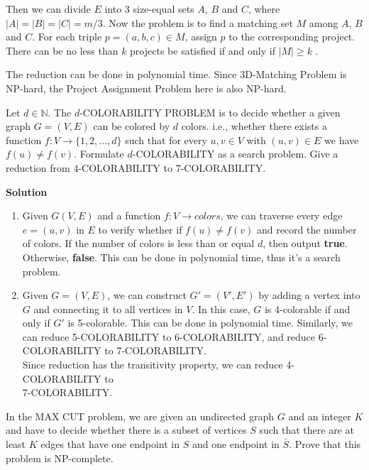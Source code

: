 \documentclass{article}
\newcounter{exercise}
\newcommand{\<}{
    \langle}
\renewcommand{\>}{
    \rangle}
\begin{document}
{Then we can divide $E$ into 3 size-equal sets $A$, $B$ and $C$, where $|A| = |B| = |C| = m/3$. Now the problem is to find a matching set $M$  among $A$, $B$ and $C$. For each triple $p=(a,b,c) \in M$, assign $p$ to the corresponding project. There can be no less than $k$ projects be satisfied if and only if $|M| \ge k$ .

The reduction can be done in polynomial time. Since 3D-Matching Problem is NP-hard, the Project Assignment Problem here is also NP-hard. 

\begin{exercise}
Let $d\in \mathbb{N}$. The $d$-\textsf{COLORABILITY PROBLEM} is to decide whether a given graph $G=(V,E)$ can be colored by $d$ colors. i.e., whether there exists a function $f:V\rightarrow \{1,2,\ldots,d\}$ such that for every $u,v\in V$ with $(u,v)\in E$ we have $f(u)\neq f(v)$. Formulate  $d$-\textsf{COLORABILITY} as a search problem. Give a reduction from $4$-\textsc{COLORABILITY} to $7$-\textsf{COLORABILITY}.
\end{exercise}

\bigskip 
\noindent \textbf{Solution}
\begin{enumerate}[label=\arabic*)]
    \item Given $G(V,E)$ and a function $f:V \rightarrow colors$, we can traverse every edge $e=(u,v)$ in $E$ to verify whether if $f(u) \neq f(v)$ and record the number of colors. If the number of colors is less than or equal $d$, then output \textbf{true}. Otherwise, \textbf{false}. This can be done in polynomial time, thus it's a search problem.
    \item Given $G=(V,E)$, we can construct $G'=(V', E')$ by adding a vertex into $G$ and connecting it to all vertices in $V$. In this case, $G$ is 4-colorable if and only if $G'$ is 5-colorable. This can be done in polynomial time. Similarly, we can reduce 5-COLORABILITY to 6-COLORABILITY, and reduce 6-COLORABILITY to 7-COLORABILITY. 
    \\
    Since reduction has the transitivity property, we can reduce 4-COLORABILITY to \\ 7-COLORABILITY.
\end{enumerate}

\begin{exercise}
In the \textsf{MAX CUT} problem, we are given an undirected graph $G$ and an integer $K$ and have to decide whether there is a subset of vertices $S$ such that there are at least $K$ edges that have one endpoint in $S$ and one endpoint in $\bar{S}$. Prove that this problem is NP-complete.
\end{exercise}

}
\end{document}
